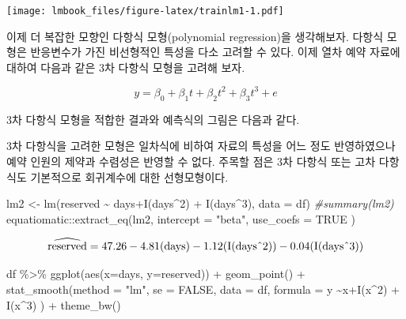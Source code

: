 \documentclass[
  10pt,
]{book}
\newenvironment{Shaded}{\begin{snugshade}}{\end{snugshade}}
\newcommand{\AttributeTok}[1]{\textcolor[rgb]{0.77,0.63,0.00}{#1}}
\newcommand{\CommentTok}[1]{\textcolor[rgb]{0.56,0.35,0.01}{\textit{#1}}}
\newcommand{\ConstantTok}[1]{\textcolor[rgb]{0.00,0.00,0.00}{#1}}
\newcommand{\DecValTok}[1]{\textcolor[rgb]{0.00,0.00,0.81}{#1}}
\newcommand{\FunctionTok}[1]{\textcolor[rgb]{0.00,0.00,0.00}{#1}}
\newcommand{\NormalTok}[1]{#1}
\newcommand{\OtherTok}[1]{\textcolor[rgb]{0.56,0.35,0.01}{#1}}
\newcommand{\SpecialCharTok}[1]{\textcolor[rgb]{0.00,0.00,0.00}{#1}}
\newcommand{\StringTok}[1]{\textcolor[rgb]{0.31,0.60,0.02}{#1}}
\theoremstyle{definition}
\theoremstyle{definition}
\theoremstyle{definition}
\theoremstyle{definition}
\theoremstyle{remark}
\begin{document}
\texttt{[image: lmbook\_files/figure-latex/trainlm1-1.pdf]}

이제 더 복잡한 모향인 다항식 모형(polynomial regression)을 생각해보자. 다항식 모형은
반응변수가 가진 비선형적인 특성을 다소 고려할 수 있다. 이제 열차 예약 자료에 대하여 다음과 같은 3차 다항식 모형을 고려해 보자.

\[ y = \beta_0 + \beta_1 t + \beta_2 t^2 + \beta_3 t^3 + e \]

3차 다항식 모형을 적합한 결과와 예측식의 그림은 다음과 같다.

3차 다항식을 고려한 모형은 일차식에 비하여 자료의 특성을 어느 정도 반영하였으나
예약 인원의 제약과 수렴성은 반영할 수 없다. 주목할 점은 3차 다항식 또는 고차 다항식도 기본적으로
회귀계수에 대한 선형모형이다.

\begin{Shaded}
\begin{Highlighting}[]
\NormalTok{lm2 }\OtherTok{\textless{}{-}} \FunctionTok{lm}\NormalTok{(reserved }\SpecialCharTok{\textasciitilde{}}\NormalTok{ days}\SpecialCharTok{+}\FunctionTok{I}\NormalTok{(days}\SpecialCharTok{\^{}}\DecValTok{2}\NormalTok{) }\SpecialCharTok{+} \FunctionTok{I}\NormalTok{(days}\SpecialCharTok{\^{}}\DecValTok{3}\NormalTok{), }\AttributeTok{data =}\NormalTok{ df)}
\CommentTok{\#summary(lm2)}
\NormalTok{equatiomatic}\SpecialCharTok{::}\FunctionTok{extract\_eq}\NormalTok{(lm2, }\AttributeTok{intercept =} \StringTok{"beta"}\NormalTok{,  }\AttributeTok{use\_coefs =} \ConstantTok{TRUE}\NormalTok{ )}
\end{Highlighting}
\end{Shaded}

\[
\operatorname{\widehat{reserved}} = 47.26 - 4.81(\operatorname{days}) - 1.12(\operatorname{I(days\char`\^2)}) - 0.04(\operatorname{I(days\char`\^3)})
\]

\begin{Shaded}
\begin{Highlighting}[]
\NormalTok{df }\SpecialCharTok{\%\textgreater{}\%} \FunctionTok{ggplot}\NormalTok{(}\FunctionTok{aes}\NormalTok{(}\AttributeTok{x=}\NormalTok{days, }\AttributeTok{y=}\NormalTok{reserved)) }\SpecialCharTok{+} 
  \FunctionTok{geom\_point}\NormalTok{() }\SpecialCharTok{+} 
  \FunctionTok{stat\_smooth}\NormalTok{(}\AttributeTok{method =} \StringTok{"lm"}\NormalTok{, }\AttributeTok{se =} \ConstantTok{FALSE}\NormalTok{, }\AttributeTok{data =}\NormalTok{ df,}
              \AttributeTok{formula =}\NormalTok{ y }\SpecialCharTok{\textasciitilde{}}\NormalTok{x}\SpecialCharTok{+}\FunctionTok{I}\NormalTok{(x}\SpecialCharTok{\^{}}\DecValTok{2}\NormalTok{) }\SpecialCharTok{+} \FunctionTok{I}\NormalTok{(x}\SpecialCharTok{\^{}}\DecValTok{3}\NormalTok{) ) }\SpecialCharTok{+}
  \FunctionTok{theme\_bw}\NormalTok{()}
\end{Highlighting}
\end{Shaded}
\end{document}
